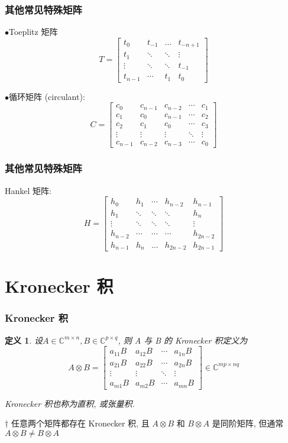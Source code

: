 \documentclass[notheorems,serif]{beamer}
\newcommand{\hei}[1]{{\HEI#1}}
\newtheorem{definition}{\hei{定义}}
\begin{document}
\begin{frame}
\frametitle{其他常见特殊矩阵}
$\bullet$Toeplitz 矩阵
$$
T=\left[\begin{array}{cccc}{t_{0}} & {t_{-1}} & {\dots} & {t_{-n+1}} \\ {t_{1}} & {\ddots} & {\ddots} & {\vdots} \\ {\vdots} & {\ddots} & {\ddots} & {t_{-1}} \\ {t_{n-1}} & {\cdots} & {t_{1}} & {t_{0}}\end{array}\right]
$$

$\bullet$循环矩阵 (circulant):
$$
C=\left[\begin{array}{ccccc}{c_{0}} & {c_{n-1}} & {c_{n-2}} & {\cdots} & {c_{1}} \\ {c_{1}} & {c_{0}} & {c_{n-1}} & {\cdots} & {c_{2}} \\ {c_{2}} & {c_{1}} & {c_{0}} & {\cdots} & {c_{3}} \\ {\vdots} & {\vdots} & {\vdots} & {\ddots} & {\vdots} \\ {c_{n-1}} & {c_{n-2}} & {c_{n-3}} & {\cdots} & {c_{0}}\end{array}\right]
$$
\end{frame}

\begin{frame}
\frametitle{其他常见特殊矩阵}
Hankel 矩阵:
$$
H=\left[\begin{array}{ccccc}{h_0} & {h_1} & {\cdots} & {h_{n-2}} & {h_{n-1}} \\ {h_1} & {\ddots} & {\ddots} & {\ddots} & {h_n}\\ {\vdots} & {\ddots} & {\ddots} & {\ddots} & {\vdots}  \\ {h_{n-2}} & {\cdots} & {\cdots} & {\cdots} & {h_{2n-2}} \\ {h_{n-1}} & {h_n} & {\dots} & {h_{2n-2}} & {h_{2n-1}}\end{array}\right]
$$
\end{frame}

\section{Kronecker 积}
\begin{frame}
\frametitle{Kronecker 积}
\begin{definition}
	设$A \in \mathbb{C}^{m \times n}, B \in \mathbb{C}^{p \times q}$, 则 A 与 B 的 Kronecker 积定义为
	$$
	A \otimes B=\left[\begin{array}{cccc}{a_{11} B} & {a_{12} B} & {\cdots} & {a_{1 n} B} \\ {a_{21} B} & {a_{22} B} & {\cdots} & {a_{2 n} B} \\ {\vdots} & {\vdots} & {\ddots} & {\vdots} \\ {a_{m 1} B} & {a_{m 2} B} & {\cdots} & {a_{m n} B}\end{array}\right] \in \mathbb{C}^{m p \times n q}
	$$
	
	Kronecker 积也称为直积, 或张量积.
\end{definition}


$\dagger$ 任意两个矩阵都存在 Kronecker 积, 且 $A ⊗ B$ 和 $B ⊗ A$ 是同阶矩阵,
但通常 $A \otimes B \neq B \otimes A$
\end{frame}
\end{document}
